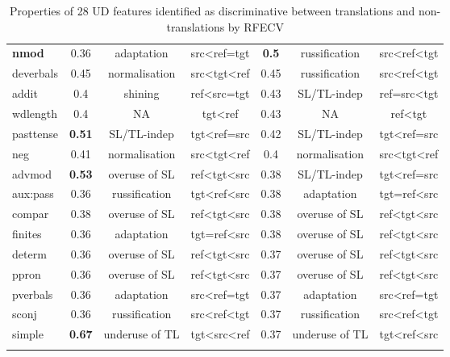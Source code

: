 \begin{longtable}[H]{p{1.6cm}|ccc||ccc}
	\textbf{nmod} & 0.36 & adaptation  & src\textless{}ref=tgt  & \textbf{0.5}  & russification & src\textless{}ref\textless{}tgt \\
	deverbals  & 0.45 & normalisation  & src\textless{}tgt\textless{}ref & 0.45 & russification & src\textless{}ref\textless{}tgt \\
	addit   & 0.4  & shining  & ref\textless{}src=tgt  & 0.43 & SL/TL-indep   & ref=src\textless{}tgt  \\
	wdlength   & 0.4  & NA  & tgt\textless{}ref & 0.43 & NA & ref\textless{}tgt \\
	pasttense  & \textbf{0.51} & SL/TL-indep & tgt\textless{}ref=src  & 0.42 & SL/TL-indep   & tgt\textless{}ref=src  \\
	neg  & 0.41 & normalisation  & src\textless{}tgt\textless{}ref & 0.4  & normalisation & src\textless{}tgt\textless{}ref \\
	advmod  & \textbf{0.53} & overuse of SL  & ref\textless{}tgt\textless{}src & 0.38 & SL/TL-indep   & tgt\textless{}ref=src  \\
	aux:pass   & 0.36 & russification  & tgt\textless{}ref\textless{}src & 0.38 & adaptation & tgt=ref\textless{}src  \\
	compar  & 0.38 & overuse of SL  & ref\textless{}tgt\textless{}src & 0.38 & overuse of SL & ref\textless{}tgt\textless{}src \\
	finites & 0.36 & adaptation  & tgt=ref\textless{}src  & 0.38 & overuse of SL & ref\textless{}tgt\textless{}src \\
	determ  & 0.36 & overuse of SL  & ref\textless{}tgt\textless{}src & 0.37 & overuse of SL & ref\textless{}tgt\textless{}src \\
	ppron   & 0.36 & overuse of SL  & ref\textless{}tgt\textless{}src & 0.37 & overuse of SL & ref\textless{}tgt\textless{}src \\
	pverbals   & 0.36 & adaptation  & src\textless{}ref=tgt  & 0.37 & adaptation & src\textless{}ref=tgt  \\
	sconj   & 0.36 & russification  & src\textless{}ref\textless{}tgt & 0.37 & russification & src\textless{}ref\textless{}tgt \\
	simple  & \textbf{0.67} & underuse of TL & tgt\textless{}src\textless{}ref & 0.37 & underuse of TL & tgt\textless{}ref\textless{}src \\
	\bottomrule
	\caption{\label{tab:shared_rfecv_feats}Properties of 28 UD features identified as discriminative between translations and non-translations by RFECV}\\
\end{longtable}

